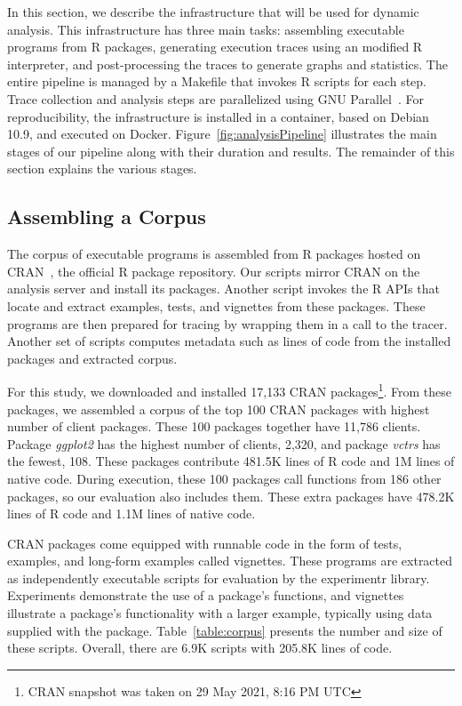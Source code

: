 \documentclass[10pt,review,sigplan,authorversion=true]{acmart}
\newcommand{\experimentr}{{\sf experimentr}\xspace}
\newcommand{\ggplot}{\textit{ggplot2}\xspace}
\newcommand{\vctrs}{\textit{vctrs}\xspace}
\begin{document}
In this section, we describe the infrastructure that will be used for dynamic
analysis. This infrastructure has three main tasks: assembling executable
programs from R packages, generating execution traces using an modified R
interpreter, and post-processing the traces to generate graphs and statistics.
The entire pipeline is managed by a Makefile that invokes R scripts for each
step. Trace collection and analysis steps are parallelized using GNU
Parallel~\cite{gnuparallel}. For reproducibility, the infrastructure is
installed in a container, based on Debian 10.9, and executed on Docker.
Figure~\ref{fig:analysisPipeline} illustrates the main stages of our pipeline
along with their duration and results. The remainder of this section explains
the various stages.

\subsection{Assembling a Corpus}

The corpus of executable programs is assembled from R packages hosted on
CRAN~\cite{ligges2017}, the official R package repository. Our scripts mirror
CRAN on the analysis server and install its packages. Another script invokes the
R APIs that locate and extract examples, tests, and vignettes from these
packages. These programs are then prepared for tracing by wrapping them in a
call to the tracer. Another set of scripts computes metadata such as lines of
code from the installed packages and extracted corpus.

For this study, we downloaded and installed 17,133 CRAN packages\footnote{CRAN
  snapshot was taken on 29 May 2021, 8:16 PM UTC}. From these packages, we
assembled a corpus of the top 100 CRAN packages with highest number of client
packages. These 100 packages together have 11,786 clients. Package \ggplot has
the highest number of clients, 2,320, and package \vctrs has the fewest, 108.
These packages contribute 481.5K lines of R code and 1M lines of native code.
During execution, these 100 packages call functions from 186 other packages, so
our evaluation also includes them. These extra packages have 478.2K lines of R
code and 1.1M lines of native code.

CRAN packages come equipped with runnable code in the form of tests, examples,
and long-form examples called vignettes. These programs are extracted as
independently executable scripts for evaluation by the \experimentr library.
Experiments demonstrate the use of a package's functions, and vignettes
illustrate a package's functionality with a larger example, typically using data
supplied with the package. Table~\ref{table:corpus} presents the number and size
of these scripts. Overall, there are 6.9K scripts with 205.8K lines of code.
\end{document}
